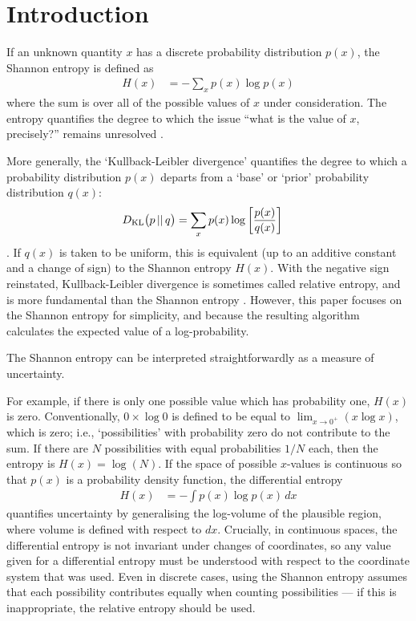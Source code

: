 \documentclass[entropy,article,accept,oneauthor,pdftex,10pt,a4paper]{mdpi}
\newcommand{\revision}{\color{darkblue}}
\begin{document}

\section{Introduction}

If an unknown quantity $x$ has a discrete probability distribution $p(x)$,
the Shannon entropy \citep{shannon, cover2012elements} is defined as
\begin{align}
H(x) &= -\sum_{x} p(x) \log p(x)
\end{align}
where the sum is over all of the possible values of $x$ under consideration.
The entropy quantifies the degree to which the issue
``what is the value of $x$, precisely?'' remains unresolved
\citep{knuth_questions}. {\revision More generally, the `Kullback-Leibler divergence'
quantifies the degree to which a probability distribution $p(x)$ departs
from a `base' or `prior' probability distribution $q(x)$:
\begin{align}
D_{\rm KL}\big(p \,||\, q\big) &=
    \sum_{x} p(x) \log\left[\frac{p(x)}{q(x)}\right]
\end{align}
\citep{knuth2012foundations, caticha2006updating}.
If $q(x)$ is taken to be uniform, this is equivalent (up to an additive
constant and a change of sign) to the Shannon entropy $H(x)$.
With the negative sign reinstated, Kullback-Leibler divergence is sometimes
called relative entropy, and is more fundamental than the Shannon entropy
\citep{knuth2012foundations}. However, this paper focuses on the Shannon
entropy for simplicity, and because the resulting algorithm calculates
the expected value of a log-probability.

The Shannon entropy can be interpreted straightforwardly as a measure of
uncertainty.} For example,
if there is only one possible value which has probability one, $H(x)$ is
zero. Conventionally, $0 \times \log 0$ is defined to be equal
to $\lim_{x \to 0^+} (x\log x)$, which is zero; i.e., `possibilities' with
probability zero do not contribute to the sum.
If there are $N$ possibilities with equal probabilities $1/N$ each,
then the entropy is $H(x) = \log(N)$.
If the space of possible $x$-values is continuous so that $p(x)$ is a
probability density function, the differential entropy
\begin{align}
H(x) &= -\int p(x) \log p(x) \, dx
\end{align}
quantifies uncertainty by generalising the log-volume
of the plausible region, where volume is defined with respect to $dx$.
{\revision Crucially, in continuous spaces, the differential entropy is not
invariant under changes of coordinates, so any value given for a
differential entropy must be understood with respect to the coordinate
system that was used. Even in discrete cases, using the Shannon entropy assumes
that each possibility contributes equally when counting possibilities ---
if this is inappropriate, the relative entropy should be used.}
\end{document}
